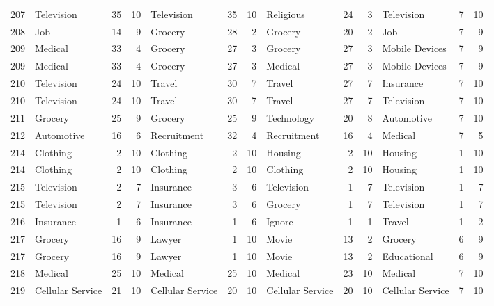 \begin{figure}[htbp]
\begin{tabular}{rlrrlrrlrrlrr}
    207   & Television & 35    & 10    & Television & 35    & 10    & Religious & 24    & 3     & Television & 7     & 10 \\
    208   & Job   & 14    & 9     & Grocery & 28    & 2     & Grocery & 20    & 2     & Job   & 7     & 9 \\
    209   & Medical & 33    & 4     & Grocery & 27    & 3     & Grocery & 27    & 3     & Mobile Devices & 7     & 9 \\
    209   & Medical & 33    & 4     & Grocery & 27    & 3     & Medical & 27    & 3     & Mobile Devices & 7     & 9 \\
    210   & Television & 24    & 10    & Travel & 30    & 7     & Travel & 27    & 7     & Insurance & 7     & 10 \\
    210   & Television & 24    & 10    & Travel & 30    & 7     & Travel & 27    & 7     & Television & 7     & 10 \\
    211   & Grocery & 25    & 9     & Grocery & 25    & 9     & Technology & 20    & 8     & Automotive & 7     & 10 \\
    212   & Automotive & 16    & 6     & Recruitment & 32    & 4     & Recruitment & 16    & 4     & Medical & 7     & 5 \\
    214   & Clothing & 2     & 10    & Clothing & 2     & 10    & Housing & 2     & 10    & Housing & 1     & 10 \\
    214   & Clothing & 2     & 10    & Clothing & 2     & 10    & Clothing & 2     & 10    & Housing & 1     & 10 \\
    215   & Television & 2     & 7     & Insurance & 3     & 6     & Television & 1     & 7     & Television & 1     & 7 \\
    215   & Television & 2     & 7     & Insurance & 3     & 6     & Grocery & 1     & 7     & Television & 1     & 7 \\
    216   & Insurance & 1     & 6     & Insurance & 1     & 6     & Ignore & -1    & -1    & Travel & 1     & 2 \\
    217   & Grocery & 16    & 9     & Lawyer & 1     & 10    & Movie & 13    & 2     & Grocery & 6     & 9 \\
    217   & Grocery & 16    & 9     & Lawyer & 1     & 10    & Movie & 13    & 2     & Educational & 6     & 9 \\
    218   & Medical & 25    & 10    & Medical & 25    & 10    & Medical & 23    & 10    & Medical & 7     & 10 \\
    219   & Cellular Service & 21    & 10    & Cellular Service & 20    & 10    & Cellular Service & 20    & 10    & Cellular Service & 7     & 10 \\

\end{tabular}
\end{figure}

